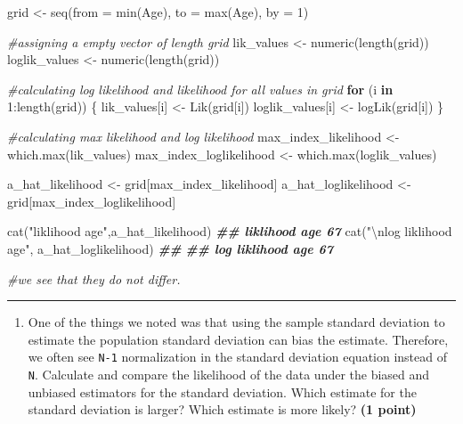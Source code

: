 \documentclass[
]{article}
\newenvironment{Shaded}{\begin{snugshade}}{\end{snugshade}}
\newcommand{\AttributeTok}[1]{\textcolor[rgb]{0.77,0.63,0.00}{#1}}
\newcommand{\CommentTok}[1]{\textcolor[rgb]{0.56,0.35,0.01}{\textit{#1}}}
\newcommand{\ControlFlowTok}[1]{\textcolor[rgb]{0.13,0.29,0.53}{\textbf{#1}}}
\newcommand{\DecValTok}[1]{\textcolor[rgb]{0.00,0.00,0.81}{#1}}
\newcommand{\DocumentationTok}[1]{\textcolor[rgb]{0.56,0.35,0.01}{\textbf{\textit{#1}}}}
\newcommand{\FunctionTok}[1]{\textcolor[rgb]{0.00,0.00,0.00}{#1}}
\newcommand{\NormalTok}[1]{#1}
\newcommand{\OtherTok}[1]{\textcolor[rgb]{0.56,0.35,0.01}{#1}}
\newcommand{\SpecialCharTok}[1]{\textcolor[rgb]{0.00,0.00,0.00}{#1}}
\newcommand{\StringTok}[1]{\textcolor[rgb]{0.31,0.60,0.02}{#1}}
\providecommand{\tightlist}{%
  \setlength{\itemsep}{0pt}\setlength{\parskip}{0pt}}
\begin{document}
\begin{Shaded}
\begin{Highlighting}[]

\NormalTok{grid }\OtherTok{\textless{}{-}} \FunctionTok{seq}\NormalTok{(}\AttributeTok{from =} \FunctionTok{min}\NormalTok{(Age), }\AttributeTok{to =} \FunctionTok{max}\NormalTok{(Age), }\AttributeTok{by =} \DecValTok{1}\NormalTok{)}

\CommentTok{\#assigning a empty vector of length grid}
\NormalTok{lik\_values }\OtherTok{\textless{}{-}} \FunctionTok{numeric}\NormalTok{(}\FunctionTok{length}\NormalTok{(grid))}
\NormalTok{loglik\_values }\OtherTok{\textless{}{-}} \FunctionTok{numeric}\NormalTok{(}\FunctionTok{length}\NormalTok{(grid))}

\CommentTok{\#calculating log likelihood and likelihood for all values in grid}
\ControlFlowTok{for}\NormalTok{ (i }\ControlFlowTok{in} \DecValTok{1}\SpecialCharTok{:}\FunctionTok{length}\NormalTok{(grid)) \{}
\NormalTok{  lik\_values[i] }\OtherTok{\textless{}{-}} \FunctionTok{Lik}\NormalTok{(grid[i])}
\NormalTok{  loglik\_values[i] }\OtherTok{\textless{}{-}} \FunctionTok{logLik}\NormalTok{(grid[i])}
\NormalTok{\}}

\CommentTok{\#calculating max likelihood and log likelihood}
\NormalTok{max\_index\_likelihood }\OtherTok{\textless{}{-}} \FunctionTok{which.max}\NormalTok{(lik\_values)}
\NormalTok{max\_index\_loglikelihood }\OtherTok{\textless{}{-}} \FunctionTok{which.max}\NormalTok{(loglik\_values)}

\NormalTok{a\_hat\_likelihood }\OtherTok{\textless{}{-}}\NormalTok{ grid[max\_index\_likelihood]}
\NormalTok{a\_hat\_loglikelihood }\OtherTok{\textless{}{-}}\NormalTok{ grid[max\_index\_loglikelihood]}


\FunctionTok{cat}\NormalTok{(}\StringTok{"liklihood age"}\NormalTok{,a\_hat\_likelihood)}
\DocumentationTok{\#\# liklihood age 67}
\FunctionTok{cat}\NormalTok{(}\StringTok{"}\SpecialCharTok{\textbackslash{}n}\StringTok{log liklihood age"}\NormalTok{, a\_hat\_loglikelihood)}
\DocumentationTok{\#\# }
\DocumentationTok{\#\# log liklihood age 67}

\CommentTok{\#we see that they do not differ.}
\end{Highlighting}
\end{Shaded}

\begin{center}\rule{0.5\linewidth}{0.5pt}\end{center}

\begin{enumerate}
\def\labelenumi{\arabic{enumi}.}
\setcounter{enumi}{4}
\tightlist
\item
  One of the things we noted was that using the sample standard
  deviation to estimate the population standard deviation can bias the
  estimate. Therefore, we often see \texttt{N-1} normalization in the
  standard deviation equation instead of \texttt{N}. Calculate and
  compare the likelihood of the data under the biased and unbiased
  estimators for the standard deviation. Which estimate for the standard
  deviation is larger? Which estimate is more likely? \textbf{(1 point)}
\end{enumerate}
\end{document}
